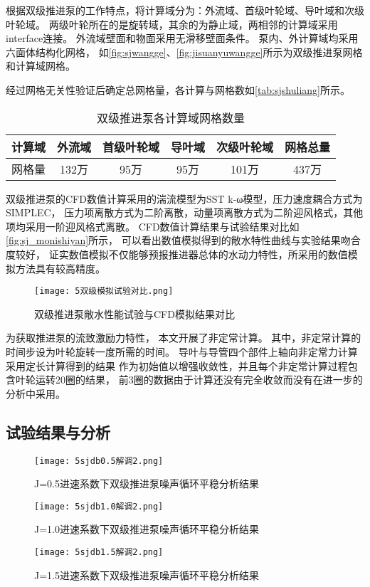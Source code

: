 根据双级推进泵的工作特点，将计算域分为：外流域、首级叶轮域、导叶域和次级叶轮域。
两级叶轮所在的是旋转域，其余的为静止域，两相邻的计算域采用interface连接。
外流域壁面和物面采用无滑移壁面条件。
泵内、外计算域均采用六面体结构化网格，
如\autoref{fig:sjwangge}、\autoref{fig:jisuanyuwangge}所示为双级推进泵网格和计算域网格。

经过网格无关性验证后确定总网格量，各计算与网格数如\autoref{tab:sjshuliang}所示。
\begin{table}[htbp]
    \centering
    \caption{\label{tab:sjshuliang}双级推进泵各计算域网格数量}
    \begin{tabular}{cccccc}
        \toprule
        计算域 & 外流域 & 首级叶轮域 & 导叶域 & 次级叶轮域 & 网格总量 \\
        \midrule
        网格量 & 132万 & 95万 & 95万 & 101万 & 437万 \\
        \bottomrule
    \end{tabular}
\end{table}

双级推进泵的CFD数值计算采用的湍流模型为SST k-ω模型，压力速度耦合方式为SIMPLEC，
压力项离散方式为二阶离散，动量项离散方式为二阶迎风格式，其他项均采用一阶迎风格式离散。
CFD数值计算结果与试验结果对比如\autoref{fig:sj_monishiyan}所示，
可以看出数值模拟得到的敞水特性曲线与实验结果吻合度较好，
证实数值模拟不仅能够预报推进器总体的水动力特性，所采用的数值模拟方法具有较高精度。
\begin{figure}[htbp]
    \centering
    \texttt{[image: 5双级模拟试验对比.png]}
    \caption{\label{fig:sj_monishiyan}双级推进泵敞水性能试验与CFD模拟结果对比}
\end{figure}

为获取推进泵的流致激励力特性，
本文开展了非定常计算。
其中，非定常计算的时间步设为叶轮旋转一度所需的时间。
导叶与导管四个部件上轴向非定常力计算采用定长计算得到的结果
作为初始值以增强收敛性，并且每个非定常计算过程包含叶轮运转20圈的结果，
前3圈的数据由于计算还没有完全收敛而没有在进一步的分析中采用。
\subsection{试验结果与分析}
\begin{figure}[htbp]
    \centering
    \texttt{[image: 5sjdb0.5解调2.png]}
    \caption{\label{fig:jisuanyuwangge}J=0.5进速系数下双级推进泵噪声循环平稳分析结果}
\end{figure}
\begin{figure}[htbp]
    \centering
    \texttt{[image: 5sjdb1.0解调2.png]}
    \caption{\label{fig:jisuanyuwangge}J=1.0进速系数下双级推进泵噪声循环平稳分析结果}
\end{figure}
\begin{figure}[htbp]
    \centering
    \texttt{[image: 5sjdb1.5解调2.png]}
    \caption{\label{fig:jisuanyuwangge}J=1.5进速系数下双级推进泵噪声循环平稳分析结果}
\end{figure}

